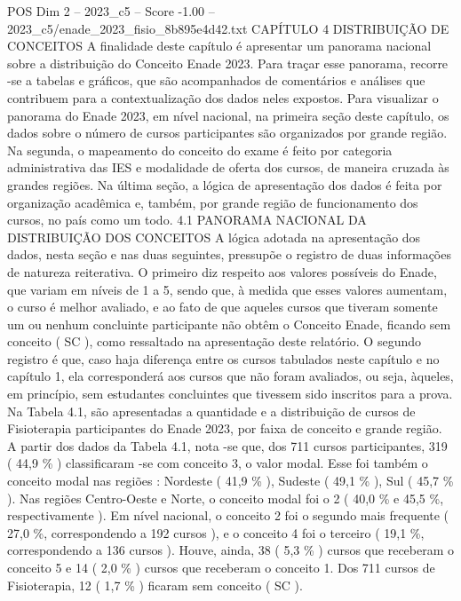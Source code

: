 \begin{textsample}{POS Dim 2 – 2023\_c5 – Score -1.00 – 2023\_c5/enade\_2023\_fisio\_8b895e4d42.txt}  \label{ex:f2_pos_264}
CAPÍTULO 4 DISTRIBUIÇÃO DE CONCEITOS A finalidade deste capítulo é apresentar um panorama nacional sobre a distribuição do Conceito Enade 2023.
Para traçar esse panorama, recorre -se a tabelas e gráficos, que são acompanhados de comentários e análises que contribuem para a contextualização dos dados neles expostos.
Para visualizar o panorama do Enade 2023, em nível nacional, na primeira seção deste capítulo, os dados sobre o número de cursos participantes são organizados por grande região.
Na segunda, o mapeamento do conceito do exame é feito por categoria administrativa das IES e modalidade de oferta dos cursos, de maneira cruzada às grandes regiões.
Na última seção, a lógica de apresentação dos dados é feita por organização acadêmica e, também, por grande região de funcionamento dos cursos, no país como um todo. 4.1 PANORAMA NACIONAL DA DISTRIBUIÇÃO DOS CONCEITOS A lógica adotada na apresentação dos dados, nesta seção e nas duas seguintes, pressupõe o registro de duas informações de natureza reiterativa.
O primeiro diz respeito aos valores possíveis do Enade, que variam em níveis de 1 a 5, sendo que, à medida que esses valores aumentam, o curso é melhor avaliado, e ao fato de que aqueles cursos que tiveram somente um ou nenhum concluinte participante não obtêm o Conceito Enade, ficando sem conceito ( SC ), como ressaltado na apresentação deste relatório.
O segundo registro é que, caso haja diferença entre os cursos tabulados neste capítulo e no capítulo 1, ela corresponderá aos cursos que não foram avaliados, ou seja, àqueles, em princípio, sem estudantes concluintes que tivessem sido inscritos para a prova.
Na Tabela 4.1, são apresentadas a quantidade e a distribuição de cursos de Fisioterapia participantes do Enade 2023, por faixa de conceito e grande região.
A partir dos dados da Tabela 4.1, nota -se que, dos 711 cursos participantes, 319 ( 44,9 \% ) classificaram -se com conceito 3, o valor modal.
Esse foi também o conceito modal nas regiões : Nordeste ( 41,9 \% ), Sudeste ( 49,1 \% ), Sul ( 45,7 \% ).
Nas regiões Centro-Oeste e Norte, o conceito modal foi o 2 ( 40,0 \% e 45,5 \%, respectivamente ).
Em nível nacional, o conceito 2 foi o segundo mais frequente ( 27,0 \%, correspondendo a 192 cursos ), e o conceito 4 foi o terceiro ( 19,1 \%, correspondendo a 136 cursos ).
Houve, ainda, 38 ( 5,3 \% ) cursos que receberam o conceito 5 e 14 ( 2,0 \% ) cursos que receberam o conceito 1.
Dos 711 cursos de Fisioterapia, 12 ( 1,7 \% ) ficaram sem conceito ( SC ).

\end{textsample}
